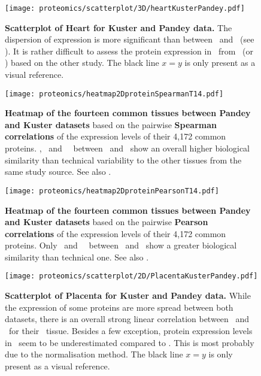 \begin{figure}[!htpb]
    \texttt{[image: proteomics/scatterplot/3D/heartKusterPandey.pdf]}\centering
    \caption[Heart: Kuster vs Pandey]{\label{fig:scat3DheartKusterPandey}\textbf{%
    Scatterplot of Heart for Kuster and Pandey data.}
    The dispersion of expression is more significant than between \pandey\ and \cutler\
    (see ).
    It is rather difficult to assess the protein expression in \Heart\ from
    \pandey\ (or \kuster) based on the other study.
    {\small The black line $x=y$ is only present as a visual reference.}}
\end{figure}

\begin{figure}[!htpb]
    \texttt{[image: proteomics/heatmap2DproteinSpearmanT14.pdf]}\centering
    \caption[Heatmap of the 14 common tissues between Pandey and Kuster datasets
    (Spearman correlation)]{\label{fig:prot2DheatmapT14}\textbf{Heatmap of
    the fourteen common tissues between Pandey and Kuster datasets}
    based on the pairwise \textbf{Spearman correlations} of the expression levels of
    their 4,172 common proteins.
    \Placenta, \Lung\ and \Kidney\ \treps\ between \pandey\ and \kuster\ show
    an overall higher biological similarity than technical variability
    to the other tissues from the same study source.
    See also .}
\end{figure}


\begin{figure}[!htpb]
    \texttt{[image: proteomics/heatmap2DproteinPearsonT14.pdf]}\centering
    \caption[Heatmap of the 14 common tissues between Pandey and Kuster
    datasets (Pearson correlation)]{\label{fig:prot2DheatmapPearson}\textbf{Heatmap
    of the fourteen common tissues between Pandey and Kuster datasets}
    based on the pairwise \textbf{Pearson correlations} of the expression levels of
    their 4,172 common proteins.
    Only \Placenta\ and \Adrenal\ \treps\ between \pandey\ and \kuster\ show
    a greater biological similarity than technical one.
    See also .}
\end{figure}

\begin{figure}[!htpb]
    \texttt{[image: proteomics/scatterplot/2D/PlacentaKusterPandey.pdf]}\centering
    \caption[Placenta: Kuster vs Pandey]{\label{fig:scat2DPlacentaKusterPandey}\textbf{%
    Scatterplot of Placenta for Kuster and Pandey data.}
    While the expression of some proteins are more spread between both datasets,
    there is an overall strong linear correlation between \pandey\ and \kuster\
    for their \placenta\ tissue.
    Besides a few exception,
    protein expression levels in \pandey\ seem to be underestimated compared to
    \kuster.
    This is most probably due to the normalisation method.
    {\small The black line $x=y$ is only present as a visual reference.}}
\end{figure}

